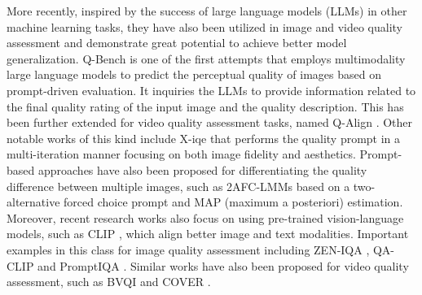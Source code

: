 \documentclass[11pt,a4paper]{article}
\begin{document}
More recently, inspired by the success of large language models (LLMs) \cite{openai:gpt4:2023,touvron2023llama} in other machine learning tasks, they have also been utilized in image and video quality assessment and demonstrate great potential to achieve better model generalization. Q-Bench \cite{wu2024qbench} is one of the first attempts that employs multimodality large language models to predict the perceptual quality of images based on prompt-driven evaluation. It inquiries the LLMs to provide information related to the final quality rating of the input image and the quality description. This has been further extended for video quality assessment tasks, named Q-Align \cite{wu2024qalign}. Other notable works of this kind include X-iqe \cite{chen2023x} that performs the quality prompt in a multi-iteration manner focusing on both image fidelity and aesthetics. Prompt-based approaches have also been proposed for differentiating the quality difference between multiple images, such as 2AFC-LMMs \cite{zhu20242afc} based on a two-alternative forced choice prompt and MAP (maximum a posteriori) estimation. Moreover, recent research works also focus on using pre-trained vision-language models, such as CLIP \cite{radford2021learning}, which align better image and text modalities. Important examples in this class for image quality assessment including ZEN-IQA \cite{miyata2024zen}, QA-CLIP \cite{pan2023quality} and PromptIQA \cite{chen2025promptiqa}. Similar works have also been proposed for video quality assessment, such as BVQI \cite{wu2023exploring,wu2023towards} and COVER \cite{he2024cover}.

\end{document}
